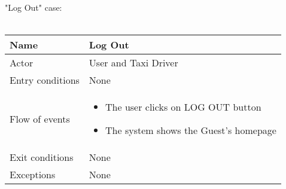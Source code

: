 \newpage

"Log Out" case:
\\
\\
\begin{tabular}{|l|p{10cm}|} 
\hline
Name & Log Out\\
\hline
Actor & User and Taxi Driver\\
\hline
Entry conditions & None\\
\hline
Flow of events &
	\begin{itemize}
		\item The user clicks on LOG OUT button
		\item The system shows the Guest's homepage
	\end{itemize}\\
\hline
Exit conditions & None\\
\hline
Exceptions & None\\
\hline
\end {tabular}




